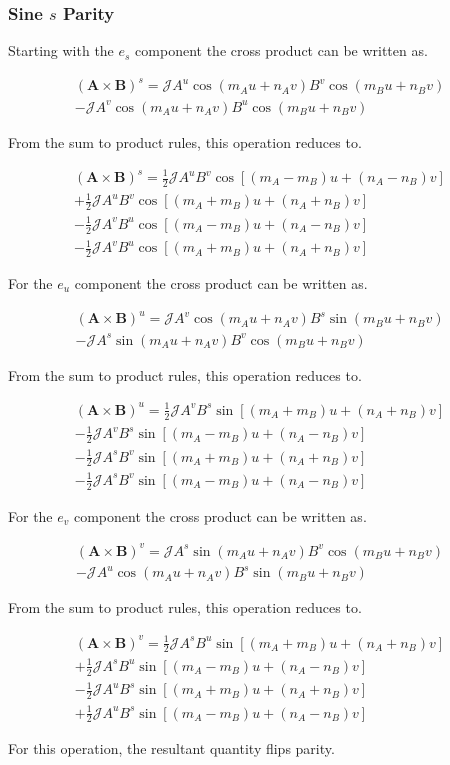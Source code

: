\documentclass[11pt]{article}
\newcommand{\brackets}[1]{\left(#1\right)}
\newcommand{\sqbrackets}[1]{\left[#1\right]}
\renewcommand{\vec}[1]{\boldsymbol#1}
\newcommand{\equ}[2]{
	\begin{equation}
    \begin{split}
	#1
	\label{#2}
	\end{split}
	\end{equation}
}
\newcommand{\crossp}[2]{#1\times#2}
\begin{document}
\subsubsection{Sine $s$ Parity}
Starting with the $e_{s}$ component the cross product can be written as.
\equ{
\brackets{\crossp{\vec{A}}{\vec{B}}}^{s}=
\mathcal{J}A^{u}\cos\brackets{m_{A}u+n_{A}v}B^{v}\cos\brackets{m_{B}u+n_{B}v}\\
-\mathcal{J}A^{v}\cos\brackets{m_{A}u+n_{A}v}B^{u}\cos\brackets{m_{B}u+n_{B}v}
}{equ:cross_esubs_sine}
From the sum to product rules, this operation reduces to.
\equ{
\brackets{\crossp{\vec{A}}{\vec{B}}}^{s}=
\frac{1}{2}\mathcal{J}A^{u}B^{v}\cos\sqbrackets{\brackets{m_{A}-m_{B}}u+\brackets{n_{A}-n_{B}}v}\\
+\frac{1}{2}\mathcal{J}A^{u}B^{v}\cos\sqbrackets{\brackets{m_{A}+m_{B}}u+\brackets{n_{A}+n_{B}}v}\\
-\frac{1}{2}\mathcal{J}A^{v}B^{u}\cos\sqbrackets{\brackets{m_{A}-m_{B}}u+\brackets{n_{A}-n_{B}}v}\\
-\frac{1}{2}\mathcal{J}A^{v}B^{u}\cos\sqbrackets{\brackets{m_{A}+m_{B}}u+\brackets{n_{A}+n_{B}}v}
}{equ:cross_esubs2_sine}

For the $e_{u}$ component the cross product can be written as.
\equ{
\brackets{\crossp{\vec{A}}{\vec{B}}}^{u}=
\mathcal{J}A^{v}\cos\brackets{m_{A}u+n_{A}v}B^{s}\sin\brackets{m_{B}u+n_{B}v}\\
-\mathcal{J}A^{s}\sin\brackets{m_{A}u+n_{A}v}B^{v}\cos\brackets{m_{B}u+n_{B}v}
}{equ:cross_esubu_sine}
From the sum to product rules, this operation reduces to.
\equ{
\brackets{\crossp{\vec{A}}{\vec{B}}}^{u}=
\frac{1}{2}\mathcal{J}A^{v}B^{s}\sin\sqbrackets{\brackets{m_{A}+m_{B}}u+\brackets{n_{A}+n_{B}}v}\\
-\frac{1}{2}\mathcal{J}A^{v}B^{s}\sin\sqbrackets{\brackets{m_{A}-m_{B}}u+\brackets{n_{A}-n_{B}}v}\\
-\frac{1}{2}\mathcal{J}A^{s}B^{v}\sin\sqbrackets{\brackets{m_{A}+m_{B}}u+\brackets{n_{A}+n_{B}}v}\\
-\frac{1}{2}\mathcal{J}A^{s}B^{v}\sin\sqbrackets{\brackets{m_{A}-m_{B}}u+\brackets{n_{A}-n_{B}}v}
}{equ:cross_esubu2_sine}

For the $e_{v}$ component the cross product can be written as.
\equ{
\brackets{\crossp{\vec{A}}{\vec{B}}}^{v}=
\mathcal{J}A^{s}\sin\brackets{m_{A}u+n_{A}v}B^{v}\cos\brackets{m_{B}u+n_{B}v}\\
-\mathcal{J}A^{u}\cos\brackets{m_{A}u+n_{A}v}B^{s}\sin\brackets{m_{B}u+n_{B}v}
}{equ:cross_esubv_sine}
From the sum to product rules, this operation reduces to.
\equ{
\brackets{\crossp{\vec{A}}{\vec{B}}}^{v}=
\frac{1}{2}\mathcal{J}A^{s}B^{u}\sin\sqbrackets{\brackets{m_{A}+m_{B}}u+\brackets{n_{A}+n_{B}}v}\\
+\frac{1}{2}\mathcal{J}A^{s}B^{u}\sin\sqbrackets{\brackets{m_{A}-m_{B}}u+\brackets{n_{A}-n_{B}}v}\\
-\frac{1}{2}\mathcal{J}A^{u}B^{s}\sin\sqbrackets{\brackets{m_{A}+m_{B}}u+\brackets{n_{A}+n_{B}}v}\\
+\frac{1}{2}\mathcal{J}A^{u}B^{s}\sin\sqbrackets{\brackets{m_{A}-m_{B}}u+\brackets{n_{A}-n_{B}}v}
}{equ:cross_esubv2_sine}
For this operation, the resultant quantity flips parity.
\end{document}
